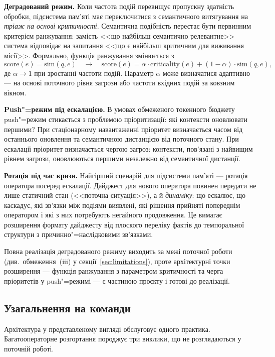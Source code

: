 \textbf{Деградований режим.}
Коли частота подій перевищує пропускну здатність обробки, підсистема пам'яті має переключитися з семантичного витягування на \emph{тріаж на основі критичності}.
Семантична подібність перестає бути первинним критерієм ранжування: замість <<що найбільш семантично релевантне>> система відповідає на запитання <<що є найбільш критичним для виживання місії>>.
Формально, функція ранжування змінюється з
\[
  \mathrm{score}(e) = \mathrm{sim}(q, e)
  \quad\longrightarrow\quad
  \mathrm{score}(e) = \alpha \cdot \mathrm{criticality}(e) + (1-\alpha) \cdot \mathrm{sim}(q, e),
\]
де $\alpha \to 1$ при зростанні частоти подій.
Параметр $\alpha$ може визначатися адаптивно --- на основі поточного рівня загрози або частоти вхідних подій за ковзним вікном.

\textbf{Push"=режим під ескалацією.}
В умовах обмеженого токенного бюджету push"=режим стикається з проблемою пріоритизації: які контексти оновлювати першими?
При стаціонарному навантаженні пріоритет визначається часом від останнього оновлення та семантичною дистанцією від поточного стану.
При ескалації пріоритет визначається чергою загроз: контексти, пов'язані з найвищим рівнем загрози, оновлюються першими незалежно від семантичної дистанції.

\textbf{Ротація під час кризи.}
Найгірший сценарій для підсистеми пам'яті --- ротація оператора посеред ескалації.
Дайджест для нового оператора повинен передати не лише статичний стан (<<поточна ситуація>>), а й \emph{динаміку}: що ескалює, що каскадує, які зв'язки між подіями виявлені, які рішення прийняті попереднім оператором і які з них потребують негайного продовження.
Це вимагає розширення формату дайджесту від плоского переліку фактів до темпоральної структури з причинно"=наслідковими зв'язками.

Повна реалізація деградованого режиму виходить за межі поточної роботи (див.~обмеження~(iii) у секції~\ref{sec:limitations}), проте архітектурні точки розширення --- функція ранжування з параметром критичності та черга пріоритетів у push"=режимі --- є частиною проєкту і готові до реалізації.


\subsection{Узагальнення на команди}
\label{sec:disc-teams}

Архітектура у представленому вигляді обслуговує одного практика.
Багатооператорне розгортання породжує три виклики, що не розглядаються у поточній роботі.

